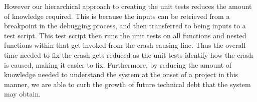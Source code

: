 However our hierarchical approach to creating the unit tests reduces the amount of knowledge required.
This is because the inputs can be retrieved from a breakpoint in the debugging process, and then transferred to being inputs to a test script.
This test script then runs the unit tests on all functions and nested functions within that get invoked from the crash causing line.
Thus the overall time needed to fix the crash gets reduced as the unit tests identify how the crash is caused, making it easier to fix.
Furthermore, by reducing the amount of knowledge needed to understand the system at the onset of a project in this manner, we are able to curb the growth of future technical debt that the system may obtain.





